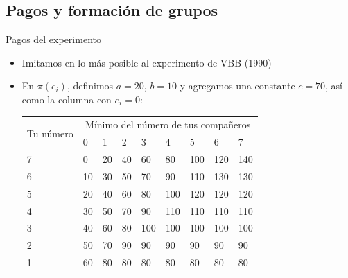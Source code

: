 \documentclass[t,9pt,xcolor=dvipsnames]{beamer}
\begin{document}
 \subsection{Pagos y formación de grupos}
 \begin{frame}{Pagos del experimento}
 \begin{itemize}
      \item Imitamos en lo más posible al experimento de VBB (1990)
      \item En $\pi(e_i)$, definimos $a=20$, $b=10$ y agregamos una constante $c=70$, así como la columna con $e_i=0$:
      \begin{table}[H]
      \centering
      \small
\begin{tabular}{l|llllllll}
\toprule
\multirow{2}{*}{Tu número} & \multicolumn{8}{c}{Mínimo del número de tus compañeros} \\
                           & 0     & 1    & 2    & 3     & 4     & 5     & 6     & 7     \\
                           \midrule
7                          & 0     & 20   & 40   & 60    & 80    & 100   & 120   & 140   \\
6                          & 10    & 30   & 50   & 70    & 90    & 110   & 130   & 130   \\
5                          & 20    & 40   & 60   & 80    & 100   & 120   & 120   & 120   \\
4                          & 30    & 50   & 70   & 90    & 110   & 110   & 110   & 110   \\
3                          & 40    & 60   & 80   & 100   & 100   & 100   & 100   & 100   \\
2                          & 50    & 70   & 90   & 90    & 90    & 90    & 90    & 90    \\
1                          & 60    & 80   & 80   & 80    & 80    & 80    & 80    & 80    \\ \bottomrule
\end{tabular}
\end{table}
 \end{itemize}
 \end{frame}
\end{document}

